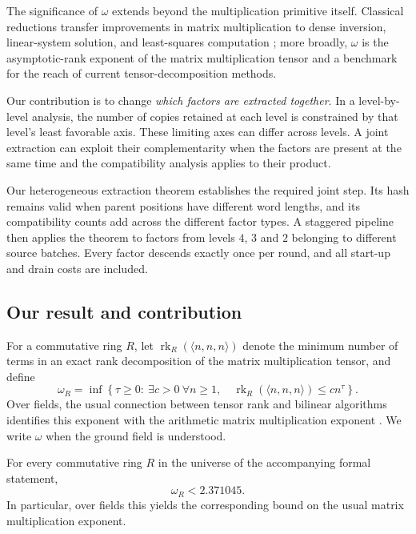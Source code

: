 \documentclass[11pt,a4paper]{article}
\DeclareMathOperator{\rk}{rk}
\begin{document}
The significance of $\omega$ extends beyond the multiplication primitive itself. Classical reductions transfer improvements in matrix multiplication to dense inversion, linear-system solution, and least-squares computation \citep{demmel2007}; more broadly, $\omega$ is the asymptotic-rank exponent of the matrix multiplication tensor and a benchmark for the reach of current tensor-decomposition methods.

Our contribution is to change \emph{which factors are extracted together}. In a level-by-level analysis, the number of copies retained at each level is constrained by that level's least favorable axis. These limiting axes can differ across levels. A joint extraction can exploit their complementarity when the factors are present at the same time and the compatibility analysis applies to their product.

Our heterogeneous extraction theorem establishes the required joint step. Its hash remains valid when parent positions have different word lengths, and its compatibility counts add across the different factor types. A staggered pipeline then applies the theorem to factors from levels $4$, $3$ and $2$ belonging to different source batches. Every factor descends exactly once per round, and all start-up and drain costs are included.

\subsection{Our result and contribution}

For a commutative ring $R$, let $\rk_R(\langle n,n,n\rangle)$ denote the minimum number of terms in an exact rank decomposition of the matrix multiplication tensor, and define
\begin{equation}\label{eq:omega}
\omega_R=\inf\!\left\{\tau\ge0:\ \exists c>0\ \forall n\ge1,\quad
\rk_R(\langle n,n,n\rangle)\le c n^\tau\right\}.
\end{equation}
Over fields, the usual connection between tensor rank and bilinear algorithms identifies this exponent with the arithmetic matrix multiplication exponent \citep{bcs1997,blaser2013}. We write $\omega$ when the ground field is understood.

\begin{resultbox}
\begin{theorem}\label{thm:main}
For every commutative ring $R$ in the universe of the accompanying formal statement,
\[
\omega_R<2.371045.
\]
In particular, over fields this yields the corresponding bound on the usual matrix multiplication exponent.
\end{theorem}
\end{resultbox}
\end{document}
